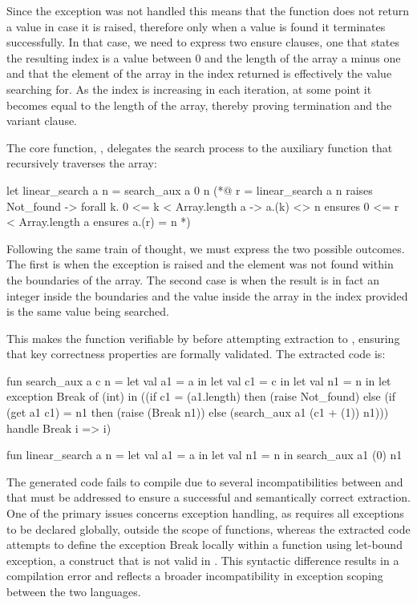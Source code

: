 Since the exception  was not handled this means that the function does not return a value in case it is raised,
therefore only when a value is found it terminates successfully. In that case, we need to express two ensure clauses, one that states 
the resulting index is a value between 0 and the length of the array a minus one and that the element of the array in the index returned 
is effectively the value searching for. As the index is increasing in each iteration, at some point it becomes equal to the length of the 
array, thereby proving termination and the variant clause.

The core function, , delegates the search process to the auxiliary function that recursively traverses 
the array:

\begin{gospell}
let linear_search a n = search_aux a 0 n
(*@
  r = linear_search a n
  raises Not_found -> forall k. 0 <= k < Array.length a -> a.(k) <> n
  ensures 0 <= r < Array.length a
  ensures a.(r) = n
*)
\end{gospell}

Following the same train of thought, we must express the two possible outcomes. The first is when the  exception
is raised and the element was not found within the boundaries of the array. The second case is when the result is in fact an integer
inside the boundaries and the value inside the array in the index provided is the same value being searched.

This makes the function verifiable by \whythree before attempting extraction to \cml, ensuring that key correctness properties are 
formally validated. The extracted code is:

\begin{cakeml}
fun search_aux a c n = let val a1 = a in
  let val c1 = c in
  let val n1 = n in
  let exception Break of (int) in
  ((if c1 = (a1.length) then (raise Not_found) 
    else (if (get a1 c1) = n1 then (raise (Break n1)) 
          else (search_aux a1 (c1 + (1)) n1)))
  handle   Break i => i)

fun linear_search a n =
  let val a1 = a in let val n1 = n in search_aux a1 (0) n1
\end{cakeml}

The generated \cml code fails to compile due to several incompatibilities between \ocaml and \cml that must be addressed 
to ensure a successful and semantically correct extraction. One of the primary issues concerns exception handling, as \cml 
requires all exceptions to be declared globally, outside the scope of functions, whereas the extracted code attempts to define 
the exception Break locally within a function using let-bound exception, a construct that is not valid in \cml. This syntactic 
difference results in a compilation error and reflects a broader incompatibility in exception scoping between the two languages.

